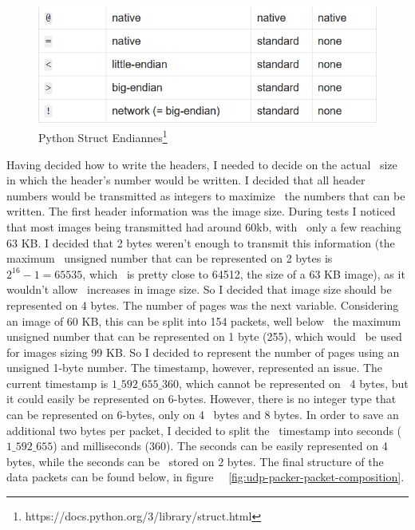 \begin{figure}[ht]
    \label{fig:udp-packer-python-endiannes}
    \includegraphics[keepaspectratio]{img/python-endiannes.png}
    \caption{Python Struct Endiannes\footnote{https://docs.python.org/3/library/struct.html}}
\end{figure}

Having decided how to write the headers, I needed to decide on the actual \
size in which the header's number would be written.
I decided that all header numbers would be transmitted as integers to maximize \
the numbers that can be written.
The first header information was the image size.
During tests I noticed that most images being transmitted had around 60kb, with \
only a few reaching 63 KB.
I decided that 2 bytes weren't enough to transmit this information (the maximum \
unsigned number that can be represented on 2 bytes is $2^{16} - 1 = 65535$, which \
is pretty close to 64512, the size of a 63 KB image), as it wouldn't allow \
increases in image size.
So I decided that image size should be represented on 4 bytes.
The number of pages was the next variable.
Considering an image of 60 KB, this can be split into 154 packets, well below \
the maximum unsigned number that can be represented on 1 byte (255), which would \
be used for images sizing 99 KB.
So I decided to represent the number of pages using an unsigned 1-byte number.
The timestamp, however, represented an issue.
The current timestamp is $1\_592\_655\_360$, which cannot be represented on \
4 bytes, but it could easily be represented on 6-bytes.
However, there is no integer type that can be represented on 6-bytes, only on 4 \
bytes and 8 bytes.
In order to save an additional two bytes per packet, I decided to split the \
timestamp into seconds ($1\_592\_655$) and milliseconds ($360$).
The seconds can be easily represented on 4 bytes, while the seconds can be \
stored on 2 bytes.
The final structure of the data packets can be found below, in figure \
~\ref{fig:udp-packer-packet-composition}.

